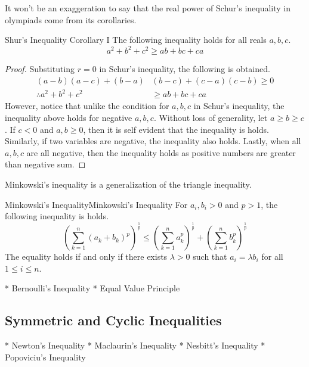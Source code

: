 \documentclass[../../../main.tex]{subfiles}
\begin{document}
It won't be an exaggeration to say that the real power of Schur's
inequality in olympiads come from its corollaries.

\begin{corollary}{}{Shur's Inequality Corollary I}
The following inequality holds for all reals $a, b, c$.
\[
a^2 + b^2 + c^2 \geq ab + bc + ca
\]
\end{corollary}
\begin{proof}
Substituting $r = 0$ in Schur's inequality, the following is obtained.
\begin{align*}
    (a - b)(a - c) + (b - a)&(b - c) + (c - a)(c - b)
    \geq 0 \\
    \therefore a^2 + b^2 + c^2
    &\geq ab + bc + ca
\end{align*}
However, notice that unlike the condition for $a, b, c$ in Schur's
inequality, the inequality above holds for negative $a, b, c$.
Without loss of generality, let $a \geq b \geq c$. If $c < 0$ and
$a, b \geq 0$, then it is self evident that the inequality is holds.
Similarly, if two variables are negative, the inequality also holds.
Lastly, when all $a, b, c$ are all negative, then the inequality
holds as positive numbers are greater than negative sum.
\end{proof}






Minkowski's inequality is a generalization of the triangle inequality.

\begin{theorem}{Minkowski's Inequality}{Minkowski's Inequality}
For $a_i, b_i > 0$ and $p > 1$, the following inequality is holds.
\[
\left( \sum_{k = 1}^n (a_k + b_k)^p \right)^\frac{1}{p}
\leq
\left( \sum_{k = 1}^n a_k^p \right)^\frac{1}{p}
    + \left( \sum_{k = 1}^n b_k^p \right)^\frac{1}{p}
\]
The equality holds if and only if there exists $\lambda > 0$ such that
$a_i = \lambda b_i$ for all $1 \leq i \leq n$.
\end{theorem}


* Bernoulli’s Inequality
* Equal Value Principle

\subsection{Symmetric and Cyclic Inequalities}
* Newton's Inequality
* Maclaurin's Inequality
* Nesbitt's Inequality
* Popoviciu's Inequality
\end{document}
